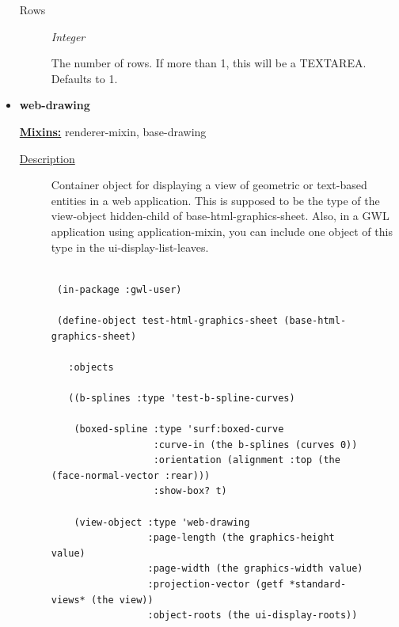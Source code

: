 \documentclass [11pt]{book}
\begin{document}
\begin{itemize}
\begin{description}
\item [Rows]
\emph{Integer}

 The number of rows. If more than 1, this will be a TEXTAREA. Defaults to 1.




\end{description}







\item {}
\label{prim:web-drawing}
\textbf{web-drawing}


\textbf{
\underline{Mixins:}} renderer-mixin, base-drawing





\begin{description}

\item [
\underline{Description}]


Container object for displaying a view of geometric 
or text-based entities in a web application. This is supposed to be the type of the
view-object hidden-child of base-html-graphics-sheet. Also, in a GWL application using 
application-mixin, you can include one object of this type in the ui-display-list-leaves.




\end{description}




\begin{figure}
\begin{lrbox}{\boxedverb}
\begin{minipage}{\linewidth}
{\small

\begin{verbatim}

 (in-package :gwl-user)

 (define-object test-html-graphics-sheet (base-html-graphics-sheet)
    
   :objects 

   ((b-splines :type 'test-b-spline-curves)
   
    (boxed-spline :type 'surf:boxed-curve
                  :curve-in (the b-splines (curves 0))
                  :orientation (alignment :top (the (face-normal-vector :rear)))
                  :show-box? t)

    (view-object :type 'web-drawing
                 :page-length (the graphics-height value)
                 :page-width (the graphics-width value)
                 :projection-vector (getf *standard-views* (the view))
                 :object-roots (the ui-display-roots))
   

\end{verbatim}}
\end{minipage}
\end{lrbox}
\end{figure}
\end{itemize}
\end{document}
